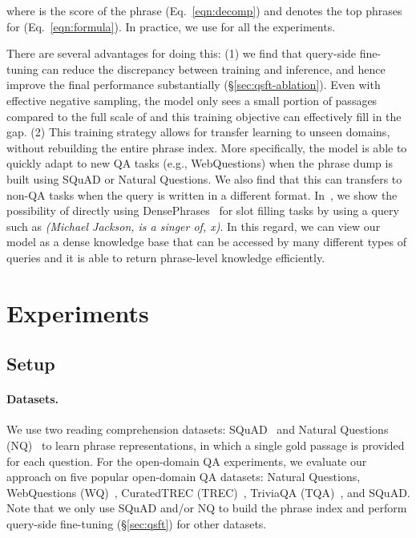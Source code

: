 \documentclass[11pt,a4paper]{article}
\newcommand{\ours}{DensePhrases}
\newcommand\ti[1]{\textit{#1}}
\begin{document}
where  is the score of the phrase  (Eq.~\eqref{eqn:decomp}) and  denotes the top  phrases for  (Eq.~\eqref{eqn:formula}).
In practice, we use  for all the experiments.


There are several advantages for doing this: (1) we find that query-side fine-tuning can reduce the discrepancy between training and inference, and hence improve the final performance substantially (\S\ref{sec:qsft-ablation}). Even with effective negative sampling, the model only sees a small portion of passages compared to the full scale of  and this training objective can effectively fill in the gap. (2) This training strategy allows for transfer learning to unseen domains, without rebuilding the entire phrase index. More specifically, the model is able to quickly adapt to new QA tasks (e.g., WebQuestions) when the phrase dump is built using SQuAD or Natural Questions. We also find that this can transfers to non-QA tasks when the query is written in a different format.
In~, we show the possibility of directly using \ours~ for slot filling tasks by using a query such as \ti{(Michael Jackson, is a singer of, x)}. In this regard, we can view our model as a dense knowledge base that can be accessed by many different types of queries and it is able to return phrase-level knowledge efficiently.



 



\section{Experiments}
\label{sec:experiments}

\subsection{Setup}
\paragraph{Datasets.}
We use two {reading comprehension} datasets: SQuAD~\cite{rajpurkar2016squad} and Natural Questions (NQ)~\cite{kwiatkowski2019natural} to learn phrase representations, in which a single gold passage is provided for each question.
For the open-domain QA experiments, we evaluate our approach on five popular {open-domain QA} datasets: Natural Questions, WebQuestions (WQ)~\citep{berant2013semantic}, CuratedTREC (TREC)~\citep{baudivs2015modeling}, TriviaQA (TQA)~\citep{joshi2017triviaqa}, and SQuAD.
Note that we only use SQuAD and/or NQ to build the phrase index and perform query-side fine-tuning (\S\ref{sec:qsft}) for other datasets.
\end{document}
